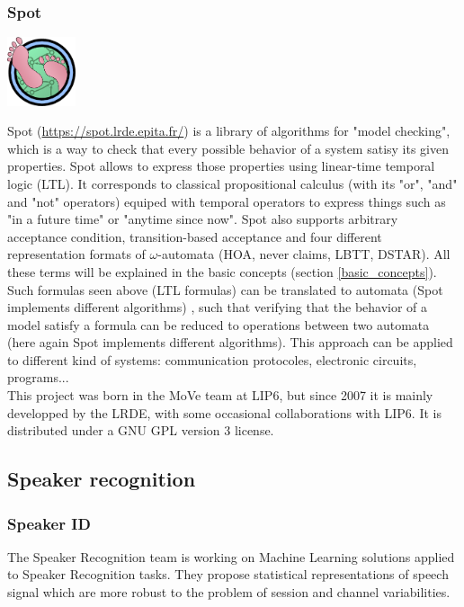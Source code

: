 \subsubsection{Spot}
\begin{center}
 \includegraphics[width=2cm]{img/spot.png}
\end{center}
Spot (\url{https://spot.lrde.epita.fr/}) is a library of algorithms for "model checking",
which is a way to check that every possible behavior of a system satisy its given properties.
Spot allows to express those properties using linear-time temporal logic (LTL). It corresponds to classical
propositional calculus (with its "or", "and" and "not" operators) equiped with temporal operators to
express things such as "in a future time" or "anytime since now". Spot also supports arbitrary 
acceptance condition, transition-based acceptance and four different representation formats of
$\omega$-automata (HOA, never claims, LBTT, DSTAR). All these terms will be explained in the basic
concepts (section \ref{basic_concepts}).\\

Such formulas seen above (LTL formulas) can be translated to automata (Spot implements different algorithms)
, such that verifying that the behavior of a model satisfy a formula can be reduced to operations between
two automata (here again Spot implements different algorithms). This approach can be applied to different kind of systems: communication protocoles,
electronic circuits, programs...\\

This project was born in the MoVe team at LIP6, but since 2007 it is mainly developped by the LRDE, with some
occasional collaborations with LIP6. It is distributed under a GNU GPL version 3 license. 


\subsection{Speaker recognition}
\subsubsection{Speaker ID}
The Speaker Recognition team is working on Machine Learning solutions applied to Speaker Recognition
tasks. They propose statistical representations of speech signal which are more robust to the problem
of session and channel variabilities.\\

